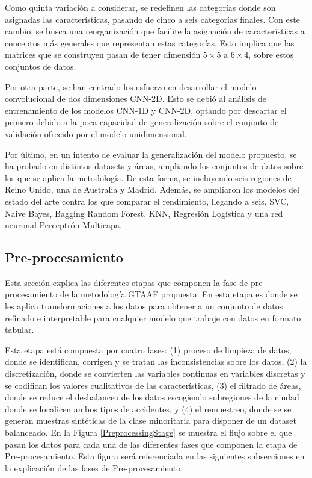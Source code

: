 \documentclass{uathesis-es}
\begin{document}


Como quinta variación a considerar, se redefinen las categorías donde son asignadas las características, pasando de cinco a seis categorías finales. Con este cambio, se busca una reorganización que facilite la asignación de características a conceptos más generales que representan estas categorías. Esto implica que las matrices que se construyen pasan de tener dimensión $5\times5$ a $6\times4$, sobre estos conjuntos de datos.

Por otra parte, se han centrado los esfuerzo en desarrollar el modelo convolucional de dos dimensiones CNN-2D. Esto se debió al análisis de entrenamiento de los modelos CNN-1D y CNN-2D, optando por descartar el primero debido a la poca capacidad de generalización sobre el conjunto de validación ofrecido por el modelo unidimensional.

Por último, en un intento de evaluar la generalización del modelo propuesto, se ha probado en distintos datasets y áreas, ampliando los conjuntos de datos sobre los que se aplica la metodología. De esta forma, se incluyendo seis regiones de Reino Unido, una de Australia y Madrid. Además, se ampliaron los modelos del estado del arte contra los que comparar el rendimiento, llegando a seis, SVC, Naive Bayes, Bagging Random Forest, KNN, Regresión Logística y una red neuronal Perceptrón Multicapa.

\subsection{Pre-procesamiento}

Esta sección explica las diferentes etapas que componen la fase de pre-procesamiento de la metodología GTAAF propuesta. En esta etapa es donde se les aplica transformaciones a los datos para obtener a un conjunto de datos refinado e interpretable para cualquier modelo que trabaje con datos en formato tabular. 

Esta etapa está compuesta por cuatro fases: (1) proceso de limpieza de datos, donde se identifican, corrigen y se tratan las inconsistencias sobre los datos, (2) la discretización, donde se convierten las variables continuas en variables discretas y se codifican los valores cualitativos de las características, (3) el filtrado de áreas, donde se reduce el desbalanceo de los datos escogiendo subregiones de la ciudad donde se localicen ambos tipos de accidentes, y (4) el remuestreo, donde se se generan muestras sintéticas de la clase minoritaria para disponer de un dataset balanceado. En la Figura \ref{PreprocessingStage} se muestra el flujo sobre el que pasan los datos para cada una de las diferentes fases que componen la etapa de Pre-procesamiento. Esta figura será referenciada en las siguientes subsecciones en la explicación de las fases de Pre-procesamiento.
\end{document}
